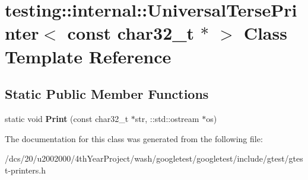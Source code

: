 \hypertarget{classtesting_1_1internal_1_1UniversalTersePrinter_3_01const_01char32__t_01_5_01_4}{}\section{testing\+:\+:internal\+:\+:Universal\+Terse\+Printer$<$ const char32\+\_\+t $\ast$ $>$ Class Template Reference}
\label{classtesting_1_1internal_1_1UniversalTersePrinter_3_01const_01char32__t_01_5_01_4}
\subsection*{Static Public Member Functions}
\begin{DoxyCompactItemize}
\item 
\mbox{\label{classtesting_1_1internal_1_1UniversalTersePrinter_3_01const_01char32__t_01_5_01_4_a48d4573656f9caa8ae7972f9cf284b38}} 
static void {\bfseries Print} (const char32\+\_\+t $\ast$str, \+::std\+::ostream $\ast$os)
\end{DoxyCompactItemize}


The documentation for this class was generated from the following file\+:\begin{DoxyCompactItemize}
\item 
/dcs/20/u2002000/4th\+Year\+Project/wash/googletest/googletest/include/gtest/gtest-\/printers.\+h\end{DoxyCompactItemize}
